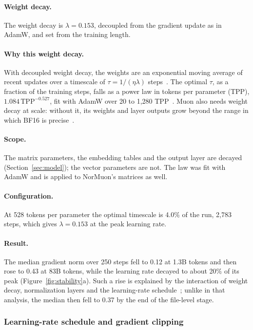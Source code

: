 \documentclass[sigconf,nonacm,balance=false]{acmart}
\begin{document}
\paragraph{Weight decay.} The weight decay is $\lambda = 0.153$, decoupled from the gradient update as in AdamW, and set
from the training length.

\paragraph{Why this weight decay.} With decoupled weight decay, the weights are an exponential moving average of recent
updates over a timescale of $\tau = 1/(\eta\lambda)$ steps~\cite{wang2024adamwema}. The optimal $\tau$, as a fraction
of the training steps, falls as a power law in tokens per parameter (TPP), $1.084\, \mathrm{TPP}^{-0.527}$, fit with
AdamW over 20 to 1,280 TPP~\cite{bergsma2025powerlines}. Muon also needs weight decay at scale: without it, its weights
and layer outputs grow beyond the range in which BF16 is precise~\cite{liu2025muon}.

\paragraph{Scope.} The matrix parameters, the embedding tables and the output layer are decayed
(Section~\ref{sec:model}); the vector parameters are not. The law was fit with AdamW and is applied to NorMuon's
matrices as well.

\paragraph{Configuration.} At 528 tokens per parameter the optimal timescale is 4.0\% of the run, 2,783 steps, which
gives $\lambda = 0.153$ at the peak learning rate.

\paragraph{Result.} The median gradient norm over 250 steps fell to 0.12 at 1.3B tokens and then rose to 0.43 at 83B
tokens, while the learning rate decayed to about 20\% of its peak (Figure~\ref{fig:stability}a). Such a rise is
explained by the interaction of weight decay, normalization layers and the learning-rate
schedule~\cite{defazio2025gradients}; unlike in that analysis, the median then fell to 0.37 by the end of the
file-level stage.

\subsubsection{Learning-rate schedule and gradient clipping}
\end{document}
